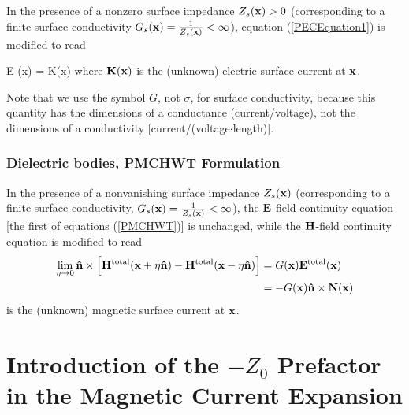 In the presence of a nonzero surface impedance $Z_s(\mathbf{x})>0$
(corresponding to a finite surface conductivity
 $G_s(\mathbf{x}) = \frac{1}{Z_s(\mathbf{x})} < \infty$),
equation (\ref{PECEquation1}) is modified to read 

{ \times \vb E (\vb x) 
  = 
   \times \vb K(\vb x)
}
where $\mathbf{K}(\mathbf{x})$ is the (unknown) electric surface current
at $\mathbf{x}$. 

Note that we use the symbol $G$, not $\sigma$, for surface
conductivity, because this quantity has the dimensions of a 
conductance (current/voltage), not the dimensions of a conductivity
[current/(voltage$\cdot$length)].

\subsubsection*{Dielectric bodies, PMCHWT Formulation} 

In the presence of a nonvanishing surface impedance $Z_s(\mathbf{x})$
(corresponding to a finite surface conductivity, 
 $G_s(\mathbf{x}) = \frac{1}{Z_s(\mathbf{x})} < \infty$),
the $\mathbf{E}$-field continuity equation [the first of equations
(\ref{PMCHWT})] is unchanged, while the $\mathbf{H}$-field
continuity equation is modified to read
\begin{subequations}
\begin{align}
 \lim_{\eta \to 0} \mathbf{\hat n}\times 
 \Big[ \mathbf{H}^{\hbox{\scriptsize{total}}}(\mathbf{x} + \eta\mathbf{\hat n})
      -\mathbf{H}^{\hbox{\scriptsize{total}}}(\mathbf{x} - \eta\mathbf{\hat n})
 \Big] 
&= G(\mathbf{x}) \mathbf{E}^{\hbox{\scriptsize{total}}}(\mathbf{x})
\\
&= -G(\mathbf{x}) \mathbf{\hat n} \times \mathbf{N}(\mathbf{x})
\label{DielectricEquationZS}
\end{align}
\end{subequations}
is the (unknown) magnetic surface current at $\mathbf{x}$.

\newpage
\section{Introduction of the $-Z_0$ Prefactor in the 
         Magnetic Current Expansion} 

